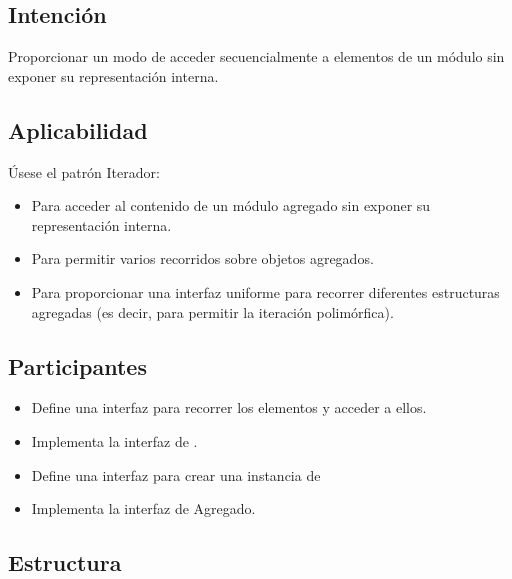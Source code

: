 \subsection*{Intención}
Proporcionar un modo de acceder secuencialmente a elementos de un módulo sin exponer su representación interna.

\subsection*{Aplicabilidad}

Úsese el patrón Iterador:
\begin{itemize}
\item Para acceder al contenido de un módulo agregado sin exponer su representación interna.
\item Para permitir varios recorridos sobre objetos agregados.
\item Para proporcionar una interfaz uniforme para recorrer diferentes estructuras agregadas (es decir, para permitir la iteración polimórfica).

\end{itemize}


\subsection*{Participantes}


\begin{itemize}
\item \Iterador Define una interfaz para recorrer los elementos y acceder a ellos.

\item \IteradorConcreto Implementa la interfaz de \Iterador.

\item \Agregado Define una interfaz para crear una instancia de \Iterador

\item \AgregadoConcreto Implementa la interfaz de Agregado.

\end{itemize}


\subsection*{Estructura}


